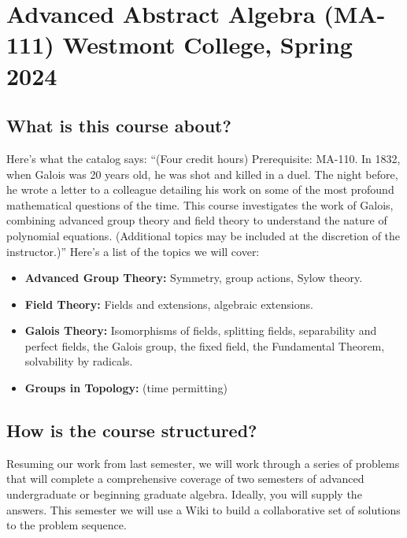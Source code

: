 \documentclass[
  twoside]{article}
\author{}
\date{\vspace{-2.5em}}
\begin{document}
\hypertarget{advanced-abstract-algebra-ma-111-westmont-college-spring-2024}{%
\section{Advanced Abstract Algebra (MA-111) Westmont College, Spring
2024}\label{advanced-abstract-algebra-ma-111-westmont-college-spring-2024}}

\hypertarget{what-is-this-course-about}{%
\subsection{What is this course
about?}\label{what-is-this-course-about}}

Here's what the catalog says: ``(Four credit hours) Prerequisite:
MA-110. In 1832, when  Galois was 20 years old, he
was shot and killed in a duel. The night before, he wrote a letter to a
colleague detailing his work on some of the most profound mathematical
questions of the time. This course investigates the work of Galois,
combining advanced group theory and field theory to understand the
nature of polynomial equations. (Additional topics may be included at
the discretion of the instructor.)'' Here's a list of the topics we will
cover:

\begin{itemize}[itemsep=0pt, parsep=1pt, partopsep=-5pt]
      \item \textbf{Advanced Group Theory:}  Symmetry, group actions, Sylow theory.
      \item \textbf{Field Theory:} Fields and extensions, algebraic extensions.
      \item \textbf{Galois Theory:} Isomorphisms of fields, splitting fields, separability and perfect fields, the Galois group, the fixed field, the Fundamental Theorem, solvability by radicals.
     \item \textbf{Groups in Topology:} (time permitting)
  \end{itemize}

\hypertarget{how-is-the-course-structured}{%
\subsection{How is the course
structured?}\label{how-is-the-course-structured}}

Resuming our work from last semester, we will work through a series of
problems that will complete a comprehensive coverage of two semesters of
advanced undergraduate or beginning graduate algebra. Ideally, you will
supply the answers. This semester we will use a Wiki to build a
collaborative set of solutions to the problem sequence.
\end{document}
